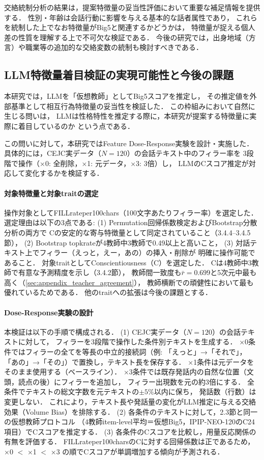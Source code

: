 \documentclass[dvipdfmx,11pt,a4paper]{bxjsarticle}
\renewcommand{\_}{\paperorigunderscore\allowbreak}%
\begin{document}
交絡統制分析の結果は，提案特徴量の妥当性評価において重要な補足情報を提供する．
性別・年齢は会話行動に影響を与える基本的な話者属性であり，
これらを統制した上でなお特徴量がBig5と関連するかどうかは，
特徴量が捉える個人差の性質を理解する上で不可欠な検証である．
今後の研究では，出身地域（方言）や職業等の追加的な交絡変数の統制も検討すべきである．

\subsection{LLM特徴量着目検証の実現可能性と今後の課題}

本研究では，LLMを「仮想教師」としてBig5スコアを推定し，
その推定値を外部基準として相互行為特徴量の妥当性を検証した．
この枠組みにおいて自然に生じる問いは，
LLMは性格特性を推定する際に，本研究が提案する特徴量に実際に着目しているのか
という点である．

この問いに対して，本研究ではFeature Dose-Response実験を設計・実施した．
具体的には，CEJC実データ（$N = 120$）の会話テキスト中のフィラー率を
3段階で操作（×0: 全削除，×1: 元データ，×3: 3倍）し，
LLMのCスコア推定が対応して変化するかを検証する．

\paragraph{対象特徴量と対象traitの選定}
操作対象としてFILL\_rate\_per\_100chars（100文字あたりフィラー率）を選定した．
選定理由は以下の3点である:
(1) Permutation回帰係数検定およびBootstrap分散分析の両方で
Cの安定的な寄与特徴量として同定されていること（3.4.4--3.4.5節），
(2) Bootstrap topk\_rateが4教師中3教師で0.49以上と高いこと，
(3) 対話テキスト上でフィラー（えっと，えー，あの）の挿入・削除が
明確に操作可能であること．
対象traitとしてConscientiousness（C）を選定した．
Cは4教師中3教師で有意な予測精度を示し（3.4.2節），
教師間一致度も$\bar{r} = 0.699$と5次元中最も高く（\ref{sec:appendix_teacher_agreement}），
教師横断での頑健性において最も優れているためである．
他のtraitへの拡張は今後の課題とする．

\paragraph{Dose-Response実験の設計}
本検証は以下の手順で構成される．
(1) CEJC実データ（$N = 120$）の会話テキストに対して，
フィラーを3段階で操作した条件別テキストを生成する．
×0条件ではフィラーの全てを等長の中立的接続詞（例: 「えっと」→「それで」，
「あの」→「その」）で置換し，テキスト長を保存する．
×1条件は元データをそのまま使用する（ベースライン）．
×3条件では既存発話内の自然な位置（文頭，読点の後）にフィラーを追加し，
フィラー出現数を元の約3倍にする．
全条件でテキストの総文字数を元テキストの$\pm 5\%$以内に保ち，
発話数（行数）は変更しない．
これにより，テキスト長や発話量の変化がLLM推定に与える交絡効果（Volume Bias）を排除する．
(2) 各条件のテキストに対して，2.3節と同一の仮想教師プロトコル
（4教師item-level平均＝仮想Big5，IPIP-NEO-120のC24項目）でCスコアを推定する．
(3) 各条件のCスコアを比較し，用量反応関係の有無を評価する．
FILL\_rate\_per\_100charsのCに対する回帰係数は正であるため，
×0 $<$ ×1 $<$ ×3 の順でCスコアが単調増加する傾向が予測される．
\end{document}
